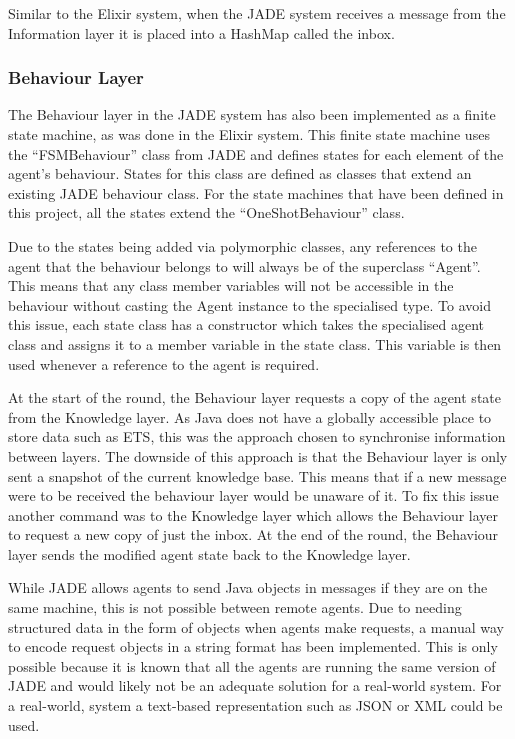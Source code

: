 Similar to the Elixir system, when the JADE system receives a message from the Information layer it is placed into a HashMap called the inbox.

\subsubsection{Behaviour Layer}

The Behaviour layer in the JADE system has also been implemented as a finite state machine, as was done in the Elixir system.
This finite state machine uses the ``FSMBehaviour'' class from JADE and defines states for each element of the agent's behaviour.
States for this class are defined as classes that extend an existing JADE behaviour class.
For the state machines that have been defined in this project, all the states extend the ``OneShotBehaviour'' class.

Due to the states being added via polymorphic classes, any references to the agent that the behaviour belongs to will always be of the superclass ``Agent''.
This means that any class member variables will not be accessible in the behaviour without casting the Agent instance to the specialised type.
To avoid this issue, each state class has a constructor which takes the specialised agent class and assigns it to a member variable in the state class.
This variable is then used whenever a reference to the agent is required.

At the start of the round, the Behaviour layer requests a copy of the agent state from the Knowledge layer.
As Java does not have a globally accessible place to store data such as ETS, this was the approach chosen to synchronise information between layers.
The downside of this approach is that the Behaviour layer is only sent a snapshot of the current knowledge base.
This means that if a new message were to be received the behaviour layer would be unaware of it.
To fix this issue another command was to the Knowledge layer which allows the Behaviour layer to request a new copy of just the inbox.
At the end of the round, the Behaviour layer sends the modified agent state back to the Knowledge layer.

While JADE allows agents to send Java objects in messages if they are on the same machine, this is not possible between remote agents.
Due to needing structured data in the form of objects when agents make requests, a manual way to encode request objects in a string format has been implemented.
This is only possible because it is known that all the agents are running the same version of JADE and would likely not be an adequate solution for a real-world system.
For a real-world, system a text-based representation such as JSON or XML could be used.
